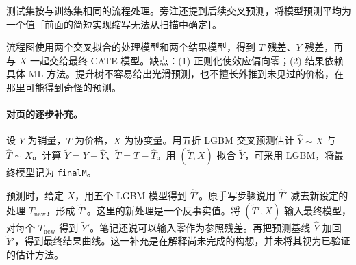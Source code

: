 \documentclass[11pt,a4paper]{article}
\begin{document}
{测试集按与训练集相同的流程处理。旁注还提到后续交叉预测，将模型预测平均为一个值［前面的简短实现缩写无法从扫描中确定］。

流程图使用两个交叉拟合的处理模型和两个结果模型，得到 $T$ 残差、$Y$ 残差，再与 $X$ 一起交给最终 CATE 模型。缺点：(1) 正则化使效应偏向零；(2) 结果依赖具体 ML 方法。提升树不容易给出光滑预测，也不擅长外推到未见过的价格，在那里可能得到奇怪的预测。

\paragraph{对页的逐步补充。}
设 $Y$ 为销量，$T$ 为价格，$X$ 为协变量。用五折 LGBM 交叉预测估计 $\hat Y\sim X$ 与 $\hat T\sim X$。计算 $\widetilde Y=Y-\hat Y$、$\widetilde T=T-\hat T$。用 $(\widetilde T,X)$ 拟合 $\widetilde Y$，可采用 LGBM，将最终模型记为 \texttt{finalM}。

预测时，给定 $X$，用五个 LGBM 模型得到 $\hat T'$。原手写步骤说用 $\hat T'$ 减去新设定的处理 $T_{\mathrm{new}}$，形成 $\widetilde T'$。这里的新处理是一个反事实值。将 $(\widetilde T',X)$ 输入最终模型，对每个 $T_{\mathrm{new}}$ 得到 $\widetilde Y'$。笔记还说可以输入零作为参照残差。再把预测基线 $\hat Y$ 加回 $\widetilde Y'$，得到最终结果曲线。这一补充是在解释尚未完成的构想，并未将其视为已验证的估计方法。

\begin{center}
\end{center}}
\end{document}
